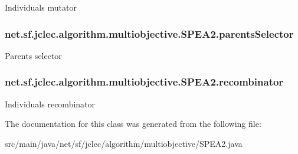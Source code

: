 Individuals mutator \hypertarget{classnet_1_1sf_1_1jclec_1_1algorithm_1_1multiobjective_1_1_s_p_e_a2_ae8da0f389d94013c1d11b0d277dff0a9}{
\subsubsection[{parents\-Selector}]{ net.\-sf.\-jclec.\-algorithm.\-multiobjective.\-S\-P\-E\-A2.\-parents\-Selector\hspace{0.3cm}{\ttfamily [protected]}}}\label{classnet_1_1sf_1_1jclec_1_1algorithm_1_1multiobjective_1_1_s_p_e_a2_ae8da0f389d94013c1d11b0d277dff0a9}
Parents selector \hypertarget{classnet_1_1sf_1_1jclec_1_1algorithm_1_1multiobjective_1_1_s_p_e_a2_abaabedd4c7063dc7943f6405dc126057}{
\subsubsection[{recombinator}]{ net.\-sf.\-jclec.\-algorithm.\-multiobjective.\-S\-P\-E\-A2.\-recombinator\hspace{0.3cm}{\ttfamily [protected]}}}\label{classnet_1_1sf_1_1jclec_1_1algorithm_1_1multiobjective_1_1_s_p_e_a2_abaabedd4c7063dc7943f6405dc126057}
Individuals recombinator 

The documentation for this class was generated from the following file\-:\begin{DoxyCompactItemize}
\item 
src/main/java/net/sf/jclec/algorithm/multiobjective/S\-P\-E\-A2.\-java\end{DoxyCompactItemize}
